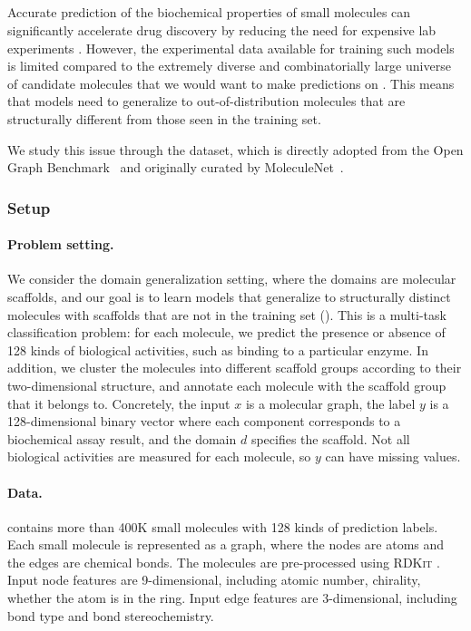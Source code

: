 \subsection{\Mol}\label{sec:app_molpcba}

Accurate prediction of the biochemical properties of small molecules can  significantly accelerate drug discovery by reducing the need for expensive lab experiments \citep{shoichet2004virtual,hughes2011principles}.
However, the experimental data available for training such models is limited compared to the extremely diverse and combinatorially large universe of candidate molecules that we would want to make predictions on \citep{bohacek1996art,sterling2015,lyu2019ultra,mccloskey2020machine}.
This means that models need to generalize to out-of-distribution molecules that are structurally different from those seen in the training set.

We study this issue through the \Mol dataset, which is directly adopted from the Open Graph Benchmark~\citep{hu2020open} and originally curated by  MoleculeNet~\citep{wu2018moleculenet}.

\subsubsection{Setup}

\paragraph{Problem setting.}
We consider the domain generalization setting, where the domains are molecular scaffolds, and our goal is to learn models that generalize to structurally distinct molecules with scaffolds that are not in the training set ().
This is a multi-task classification problem: for each molecule, we predict the presence or absence of 128 kinds of biological activities, such as binding to a particular enzyme.
In addition, we cluster the molecules into different scaffold groups according to their two-dimensional structure, and annotate each molecule with the scaffold group that it belongs to.
Concretely, the input $x$ is a molecular graph, the label $y$ is a 128-dimensional binary vector where each component corresponds to a biochemical assay result, and the domain $d$ specifies the scaffold. Not all biological activities are measured for each molecule, so $y$ can have missing values.

\paragraph{Data.}
\Mol contains more than 400K small molecules with 128 kinds of prediction labels.
Each small molecule is represented as a graph, where the nodes are atoms and the edges are chemical bonds.
The molecules are pre-processed using \textsc{RDKit} \citep{landrum2006rdkit}.
Input node features are 9-dimensional, including atomic number, chirality, whether the atom is in the ring. Input edge features are 3-dimensional, including bond type and bond stereochemistry.

